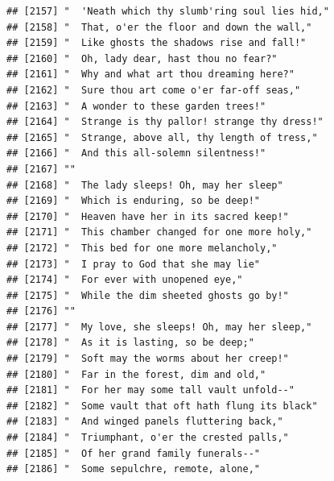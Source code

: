 \documentclass{article}\usepackage[]{graphicx}\usepackage[]{color}
\makeatletter
\newenvironment{kframe}{%
 \def\at@end@of@kframe{}%
 \ifinner\ifhmode%
  \def\at@end@of@kframe{\end{minipage}}%
  \begin{minipage}{\columnwidth}%
 \fi\fi%
 \def\FrameCommand##1{\hskip\@totalleftmargin \hskip-\fboxsep
 \colorbox{shadecolor}{##1}\hskip-\fboxsep
     \hskip-\linewidth \hskip-\@totalleftmargin \hskip\columnwidth}%
 \MakeFramed {\advance\hsize-\width
   \@totalleftmargin\z@ \linewidth\hsize
   \@setminipage}}%
 {\par\unskip\endMakeFramed%
 \at@end@of@kframe}
\newenvironment{knitrout}{}{} %
\makeatother
\begin{document}
\begin{knitrout}
\begin{kframe}
\begin{verbatim}
## [2157] "  'Neath which thy slumb'ring soul lies hid,"                                
## [2158] "  That, o'er the floor and down the wall,"                                   
## [2159] "  Like ghosts the shadows rise and fall!"                                    
## [2160] "  Oh, lady dear, hast thou no fear?"                                         
## [2161] "  Why and what art thou dreaming here?"                                      
## [2162] "  Sure thou art come o'er far-off seas,"                                     
## [2163] "  A wonder to these garden trees!"                                           
## [2164] "  Strange is thy pallor! strange thy dress!"                                 
## [2165] "  Strange, above all, thy length of tress,"                                  
## [2166] "  And this all-solemn silentness!"                                           
## [2167] ""                                                                            
## [2168] "  The lady sleeps! Oh, may her sleep"                                        
## [2169] "  Which is enduring, so be deep!"                                            
## [2170] "  Heaven have her in its sacred keep!"                                       
## [2171] "  This chamber changed for one more holy,"                                   
## [2172] "  This bed for one more melancholy,"                                         
## [2173] "  I pray to God that she may lie"                                            
## [2174] "  For ever with unopened eye,"                                               
## [2175] "  While the dim sheeted ghosts go by!"                                       
## [2176] ""                                                                            
## [2177] "  My love, she sleeps! Oh, may her sleep,"                                   
## [2178] "  As it is lasting, so be deep;"                                             
## [2179] "  Soft may the worms about her creep!"                                       
## [2180] "  Far in the forest, dim and old,"                                           
## [2181] "  For her may some tall vault unfold--"                                      
## [2182] "  Some vault that oft hath flung its black"                                  
## [2183] "  And winged panels fluttering back,"                                        
## [2184] "  Triumphant, o'er the crested palls,"                                       
## [2185] "  Of her grand family funerals--"                                            
## [2186] "  Some sepulchre, remote, alone,"                                            

\end{verbatim}
\end{kframe}
\end{knitrout}
\end{document}
